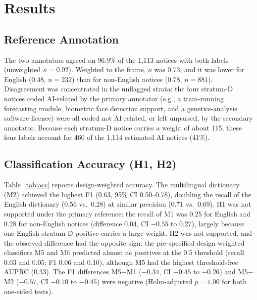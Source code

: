 \section{Results}
\subsection{Reference Annotation}
The two annotators agreed on 96.9\% of the 1,113 notices with both labels (unweighted $\kappa=0.92$). Weighted to the frame, $\kappa$ was 0.73, and it was lower for English (0.48, $n=232$) than for non-English notices (0.78, $n=881$). Disagreement was concentrated in the unflagged strata: the four stratum-D notices coded AI-related by the primary annotator (e.g., a train-running forecasting module, biometric face detection support, and a genetics-analysis software licence) were all coded not AI-related, or left unparsed, by the secondary annotator. Because each stratum-D notice carries a weight of about 115, these four labels account for 460 of the 1,114 estimated AI notices (41\%).

\subsection{Classification Accuracy (H1, H2)}
Table~\ref{tab:acc} reports design-weighted accuracy. The multilingual dictionary (M2) achieved the highest F1 (0.63, 95\% CI 0.50--0.78), doubling the recall of the English dictionary (0.56 vs.\ 0.28) at similar precision (0.71 vs.\ 0.69). H1 was not supported under the primary reference: the recall of M1 was 0.25 for English and 0.28 for non-English notices (difference 0.04, CI $-0.55$ to 0.27), largely because one English stratum-D positive carries a large weight. H2 was not supported, and the observed difference had the opposite sign: the pre-specified design-weighted classifiers M5 and M6 predicted almost no positives at the 0.5 threshold (recall 0.03 and 0.05; F1 0.06 and 0.10), although M5 had the highest threshold-free AUPRC (0.33). The F1 differences M5$-$M1 ($-0.34$, CI $-0.45$ to $-0.26$) and M5$-$M2 ($-0.57$, CI $-0.70$ to $-0.45$) were negative (Holm-adjusted $p=1.00$ for both one-sided tests). 

